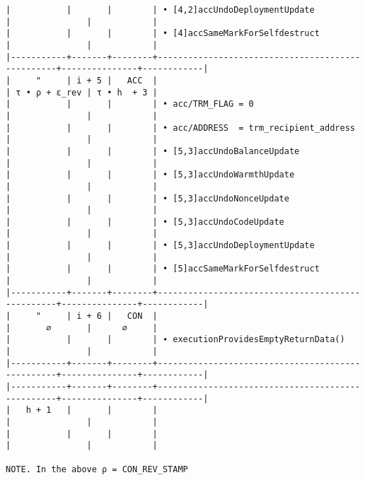 \documentclass[varwidth=\maxdimen,margin=0.5cm,multi={verbatim}]{standalone}
\begin{document}
\begin{verbatim}
|           |       |        | • [4,2]accUndoDeploymentUpdate                   |               |            |
|           |       |        | • [4]accSameMarkForSelfdestruct                  |               |            |
|-----------+-------+--------+--------------------------------------------------+---------------+------------|
|     "     | i + 5 |   ACC  |                                                  | τ • ρ + ε_rev | τ • h  + 3 |
|           |       |        | • acc/TRM_FLAG = 0                               |               |            |
|           |       |        | • acc/ADDRESS  = trm_recipient_address           |               |            |
|           |       |        | • [5,3]accUndoBalanceUpdate                      |               |            |
|           |       |        | • [5,3]accUndoWarmthUpdate                       |               |            |
|           |       |        | • [5,3]accUndoNonceUpdate                        |               |            |
|           |       |        | • [5,3]accUndoCodeUpdate                         |               |            |
|           |       |        | • [5,3]accUndoDeploymentUpdate                   |               |            |
|           |       |        | • [5]accSameMarkForSelfdestruct                  |               |            |
|-----------+-------+--------+--------------------------------------------------+---------------+------------|
|     "     | i + 6 |   CON  |                                                  |       ∅       |      ∅     |
|           |       |        | ∙ executionProvidesEmptyReturnData()             |               |            |
|-----------+-------+--------+--------------------------------------------------+---------------+------------|
|-----------+-------+--------+--------------------------------------------------+---------------+------------|
|   h + 1   |       |        |                                                  |               |            |
|           |       |        |                                                  |               |            |

NOTE. In the above ρ = CON_REV_STAMP
\end{verbatim}
\end{document}
